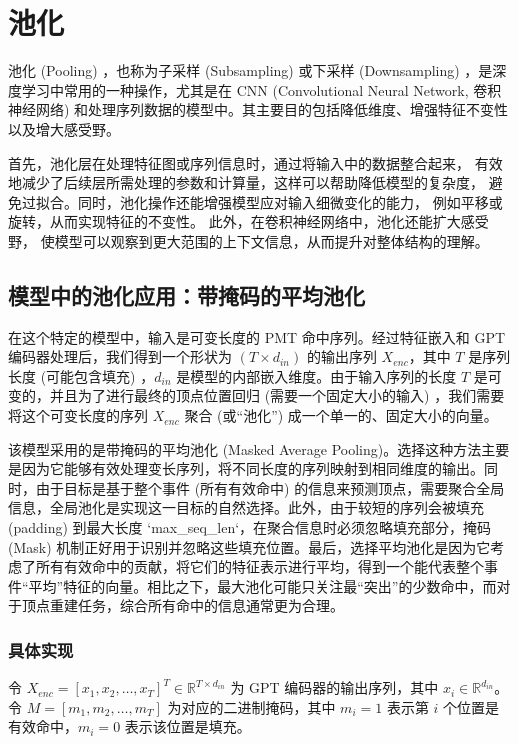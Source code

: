 
\chapter{池化}

池化 (Pooling) ，也称为子采样 (Subsampling) 或下采样 (Downsampling) ，是深度学习中常用的一种操作，尤其是在 CNN (Convolutional Neural Network, 卷积神经网络) 和处理序列数据的模型中。其主要目的包括降低维度、增强特征不变性以及增大感受野。

首先，池化层在处理特征图或序列信息时，通过将输入中的数据整合起来，
有效地减少了后续层所需处理的参数和计算量，这样可以帮助降低模型的复杂度，
避免过拟合。同时，池化操作还能增强模型应对输入细微变化的能力，
例如平移或旋转，从而实现特征的不变性。
此外，在卷积神经网络中，池化还能扩大感受野，
使模型可以观察到更大范围的上下文信息，从而提升对整体结构的理解。

\section{模型中的池化应用：带掩码的平均池化}

在这个特定的模型中，输入是可变长度的 PMT 命中序列。经过特征嵌入和 GPT 编码器处理后，我们得到一个形状为 $(T \times d_{in})$ 的输出序列 $X_{enc}$，其中 $T$ 是序列长度 (可能包含填充) ，$d_{in}$ 是模型的内部嵌入维度。由于输入序列的长度 $T$ 是可变的，并且为了进行最终的顶点位置回归 (需要一个固定大小的输入) ，我们需要将这个可变长度的序列 $X_{enc}$ 聚合 (或“池化”) 成一个单一的、固定大小的向量。

该模型采用的是带掩码的平均池化 (Masked Average Pooling)。选择这种方法主要是因为它能够有效处理变长序列，将不同长度的序列映射到相同维度的输出。同时，由于目标是基于整个事件 (所有有效命中) 的信息来预测顶点，需要聚合全局信息，全局池化是实现这一目标的自然选择。此外，由于较短的序列会被填充 (padding) 到最大长度 `max\_seq\_len`，在聚合信息时必须忽略填充部分，掩码 (Mask) 机制正好用于识别并忽略这些填充位置。最后，选择平均池化是因为它考虑了所有有效命中的贡献，将它们的特征表示进行平均，得到一个能代表整个事件“平均”特征的向量。相比之下，最大池化可能只关注最“突出”的少数命中，而对于顶点重建任务，综合所有命中的信息通常更为合理。

\subsection{具体实现}

令 $X_{enc} = [x_1, x_2, \dots, x_T]^T \in \mathbb{R}^{T \times d_{in}}$ 为 GPT 编码器的输出序列，其中 $x_i \in \mathbb{R}^{d_{in}}$。
令 $M = [m_1, m_2, \dots, m_T]$ 为对应的二进制掩码，其中 $m_i=1$ 表示第 $i$ 个位置是有效命中，$m_i=0$ 表示该位置是填充。


